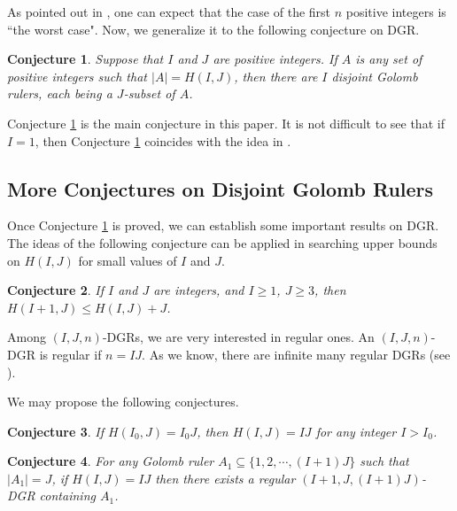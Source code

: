 \documentclass[preprint,12pt]{elsarticle}
\newtheorem{conj}{Conjecture}
\begin{document}
As pointed out in \cite{kssa1975}, one can expect that the case of the first $n$ positive integers is ``the worst case".
Now, we generalize it to the following conjecture on DGR.

\vspace{0.3cm}
\begin{conj} \label{genefirstn}
Suppose that $I$ and $J$ are positive integers. If $A$ is any set of positive integers such that $|A| = H(I, J)$, then there are $I$ disjoint Golomb rulers, each being a $J$-subset of $A$.
\end{conj}
\vspace{0.3cm}

Conjecture \ref{genefirstn} is the main conjecture in this paper.
It is not difficult to see that if $I=1$, then Conjecture \ref{genefirstn} coincides with the idea in \cite{kssa1975}.



\subsection{More Conjectures on Disjoint Golomb Rulers}\label{22}


Once  Conjecture \ref{genefirstn} is proved, we can establish some important results on DGR. 
The ideas of the following conjecture can be applied in searching upper bounds on $H(I,J)$  for small values of $I$ and $J$.


\vspace{0.3cm}
\begin{conj} \label{difference}
If $I$ and $J$ are integers, and $I \geq 1$, $J \geq 3$, then $H(I+1, J) \leq H(I, J) + J$.
\end{conj}
\vspace{0.3cm}




Among $(I,J,n)$-DGRs, we are very interested in regular ones. An $(I,J,n)$-DGR is regular if $n = IJ$. As we know, there are infinite many regular DGRs (see \cite{Klove}).


We may propose the following conjectures.

\vspace{0.3cm}
\begin{conj} \label{genefirstn2}
If $H(I_0, J) = I_0 J$, then $H(I, J) = IJ$ for any integer $I > I_0$.
\end{conj}
\vspace{0.3cm}



\vspace{0.3cm}
\begin{conj} \label{genefirstnb}
For any Golomb ruler $A_1 \subseteq \{1, 2, \cdots, (I+1)J\}$ such that $|A_1| = J$, if $H(I,J) = IJ$ then there exists a  regular $(I+1,J,(I+1)J)$-DGR containing $A_1$.
\end{conj}
\vspace{0.3cm}
\end{document}
